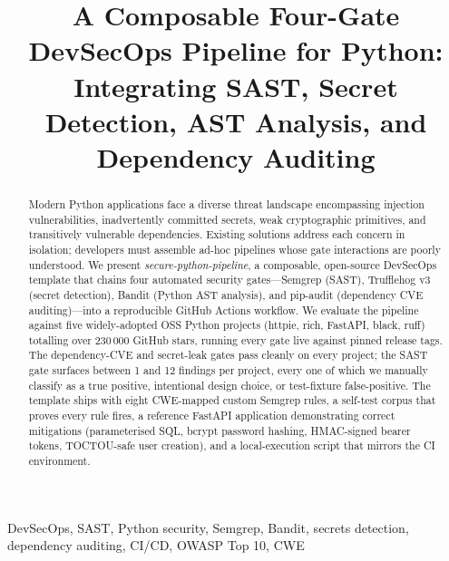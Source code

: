 \documentclass[conference]{IEEEtran}
\begin{document}
\title{A Composable Four-Gate DevSecOps Pipeline for Python:\\
Integrating SAST, Secret Detection, AST Analysis, and Dependency Auditing}

\author{
}

\maketitle

\begin{abstract}
Modern Python applications face a diverse threat landscape encompassing
injection vulnerabilities, inadvertently committed secrets, weak cryptographic
primitives, and transitively vulnerable dependencies. Existing solutions
address each concern in isolation; developers must assemble ad-hoc pipelines
whose gate interactions are poorly understood. We present \emph{secure-python-pipeline},
a composable, open-source DevSecOps template that chains four automated
security gates---Semgrep (SAST), Trufflehog v3 (secret detection), Bandit
(Python AST analysis), and pip-audit (dependency CVE auditing)---into a
reproducible GitHub Actions workflow. We evaluate the pipeline against five
widely-adopted OSS Python projects (httpie, rich, FastAPI, black, ruff)
totalling over 230\,000 GitHub stars, running every gate live against pinned
release tags. The dependency-CVE and secret-leak gates pass cleanly on every
project; the SAST gate surfaces between 1 and 12 findings per project, every
one of which we manually classify as a true positive, intentional design
choice, or test-fixture false-positive. The template ships with eight
CWE-mapped custom Semgrep rules, a self-test corpus that proves every rule
fires, a reference FastAPI application demonstrating correct mitigations
(parameterised SQL, bcrypt password hashing, HMAC-signed bearer tokens,
TOCTOU-safe user creation), and a local-execution script that mirrors the
CI environment.
\end{abstract}

\begin{IEEEkeywords}
DevSecOps, SAST, Python security, Semgrep, Bandit, secrets detection,
dependency auditing, CI/CD, OWASP Top 10, CWE
\end{IEEEkeywords}
\end{document}
